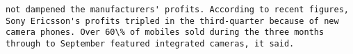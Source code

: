 \documentclass[11pt]{article}
\begin{document}
\begin{Verbatim}[commandchars=\\\{\}]
not dampened the manufacturers' profits. According to recent figures, Sony Ericsson's profits tripled in the third-quarter because of new camera phones. Over 60\% of mobiles sold during the three months through to September featured integrated cameras, it said.                                                                                                                                                                                                                                                                                                                                                                                                                                                                                                                                                                                                                                                                                                                                                                                                                                                                                                                                                                                                                                                                                                                                                                                                                                                                                                                                                                                                                                                                                                                                                                                                                          

\end{Verbatim}
\end{document}
